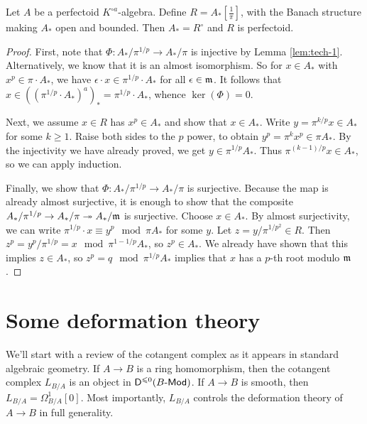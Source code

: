 \documentclass{article}
\begin{document}
\begin{proposition}
Let $A$ be a perfectoid $K^{\circ a}$-algebra. Define $R=A_\ast[\frac 1 \pi]$, with 
the Banach structure making $A_\ast$ open and bounded. Then $A_\ast = R^\circ$ 
and $R$ is perfectoid. 
\end{proposition}
\begin{proof}
First, note that $\Phi:A_\ast/\pi^{1/p} \to A_\ast/\pi$ is injective by Lemma 
\ref{lem:tech-1}. Alternatively, we know that it is an almost isomorphism. So 
for $x\in A_\ast$ with $x^p\in \pi\cdot A_\ast$, we have  
$\epsilon\cdot x\in \pi^{1/p}\cdot A_\ast$ for all $\epsilon\in\mathfrak{m}$. It follows 
that $x\in ((\pi^{1/p}\cdot A_\ast)^a)_\ast = \pi^{1/p}\cdot A_\ast$, whence 
$\ker(\Phi)=0$. 

Next, we assume $x\in R$ has $x^p\in A_\ast$ and show that $x\in A_\ast$. Write 
$y=\pi^{k/p} x\in A_\ast$ for some $k\geqslant 1$. Raise both sides to the $p$ 
power, to obtain $y^p=\pi^k x^p\in \pi A_\ast$. By the injectivity we have already 
proved, we get $y\in \pi^{1/p} A_\ast$. Thus 
$\pi^{(k-1)/p} x\in A_\ast$, so we can apply induction. 

Finally, we show that $\Phi:A_\ast/\pi^{1/p} \to A_\ast/\pi$ is surjective. Because 
the map is already almost surjective, it is enough to show that the composite 
$A_\ast/\pi^{1/p} \to A_\ast/\pi \twoheadrightarrow A_\ast/\mathfrak{m}$ is surjective. 
Choose $x\in A_\ast$. By almost surjectivity, we can write 
$\pi^{1/p}\cdot x \equiv y^p\mod \pi A_\ast$ for some $y$. Let $z=y/\pi^{1/p^2}\in R$. Then 
$z^p = y^p/\pi^{1/p} = x\mod \pi^{1-1/p} A_\ast$, so $z^p\in A_\ast$. We already 
have shown that this implies $z\in A_\ast$, so $z^p=q\mod \pi^{1/p} A_\ast$ implies 
that $x$ has a $p$-th root modulo $\mathfrak{m}$. 
\end{proof}





\section{Some deformation theory}

We'll start with a review of the cotangent complex as it appears in standard 
algebraic geometry. If $A\to B$ is a ring homomorphism, then the cotangent 
complex $L_{B/A}$ is an object in $\mathsf D^{\leqslant 0}(B\textnormal{-}\mathsf{Mod})$. If 
$A\to B$ is smooth, then $L_{B/A} = \Omega_{B/A}^1[0]$. Most importantly, 
$L_{B/A}$ controls the deformation theory of $A\to B$ in full generality. 
\end{document}
